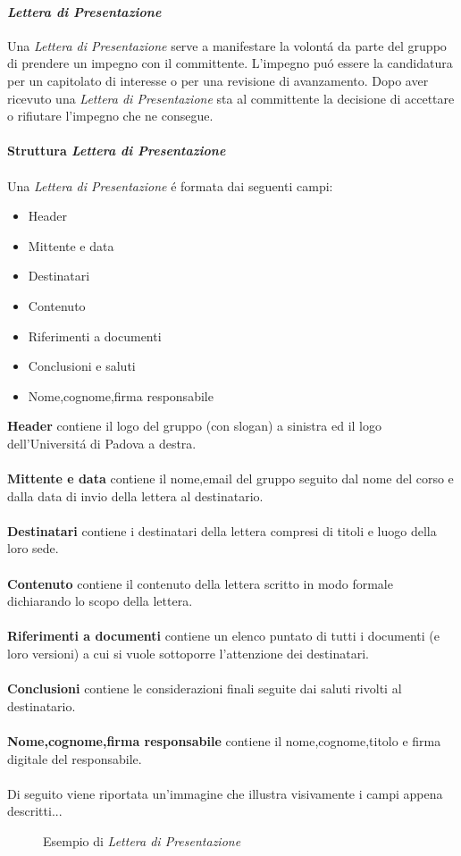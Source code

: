 \paragraph{\textit{Lettera di Presentazione}}
Una \textit{Lettera di Presentazione} serve a manifestare la volontá da parte del gruppo di prendere un impegno con il committente.
L'impegno puó essere la candidatura per un capitolato di interesse o per una revisione di avanzamento.
Dopo aver ricevuto una \textit{Lettera di Presentazione} sta al committente la decisione di accettare o rifiutare l'impegno che ne consegue.
\\\\
\textbf{Struttura \textit{Lettera di Presentazione}}
\\\\
Una \textit{\textit{Lettera di Presentazione}} é formata dai seguenti campi:
\begin{itemize}
    \item Header
    \item Mittente e data
    \item Destinatari
    \item Contenuto
    \item Riferimenti a documenti
    \item Conclusioni e saluti
    \item Nome,cognome,firma responsabile
\end{itemize}
\textbf{Header} contiene il logo del gruppo (con slogan) a sinistra ed il logo dell'Universitá di Padova a destra.
\\\\
\textbf{Mittente e data} contiene il nome,email del gruppo seguito dal nome del corso e dalla data di invio della lettera al destinatario.
\\\\
\textbf{Destinatari} contiene i destinatari della lettera compresi di titoli e luogo della loro sede.
\\\\
\textbf{Contenuto} contiene il contenuto della lettera scritto in modo formale dichiarando lo scopo della lettera.
\\\\
\textbf{Riferimenti a documenti} contiene un elenco puntato di tutti i documenti (e loro versioni) a cui si vuole sottoporre l'attenzione dei destinatari. 
\\\\
\textbf{Conclusioni} contiene le considerazioni finali seguite dai saluti rivolti al destinatario.
\\\\
\textbf{Nome,cognome,firma responsabile} contiene il nome,cognome,titolo e firma digitale del responsabile.
\\\\
Di seguito viene riportata un'immagine che illustra visivamente i campi appena descritti...
\begin{figure}[htbp]
    \centering
    \caption{Esempio di \textit{Lettera di Presentazione}}
\end{figure}
\pagebreak